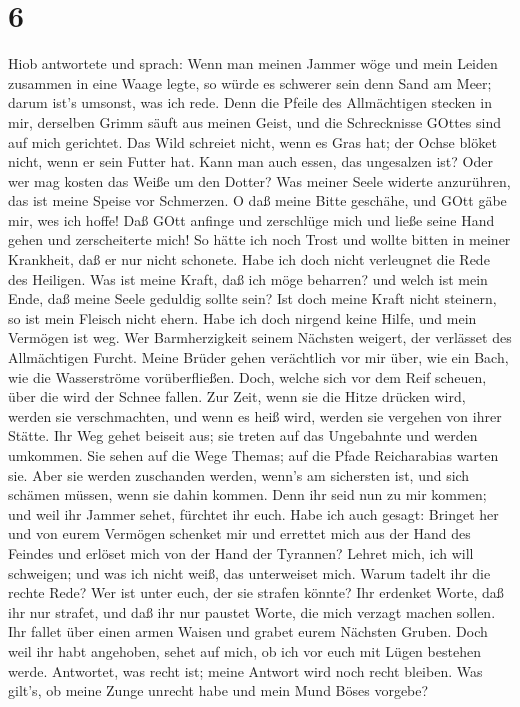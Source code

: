 \hypertarget{section-5}{%
\section{6}\label{section-5}}

 Hiob antwortete und sprach:  Wenn man meinen
Jammer wöge und mein Leiden zusammen in eine Waage legte, 
so würde es schwerer sein denn Sand am Meer; darum ist's umsonst, was
ich rede.  Denn die Pfeile des Allmächtigen stecken in mir,
derselben Grimm säuft aus meinen Geist, und die Schrecknisse GOttes sind
auf mich gerichtet.  Das Wild schreiet nicht, wenn es Gras
hat; der Ochse blöket nicht, wenn er sein Futter hat.  Kann
man auch essen, das ungesalzen ist? Oder wer mag kosten das Weiße um den
Dotter?  Was meiner Seele widerte anzurühren, das ist meine
Speise vor Schmerzen.  O daß meine Bitte geschähe, und GOtt
gäbe mir, wes ich hoffe!  Daß GOtt anfinge und zerschlüge
mich und ließe seine Hand gehen und zerscheiterte mich!  So
hätte ich noch Trost und wollte bitten in meiner Krankheit, daß er nur
nicht schonete. Habe ich doch nicht verleugnet die Rede des Heiligen.
 Was ist meine Kraft, daß ich möge beharren? und welch ist
mein Ende, daß meine Seele geduldig sollte sein?  Ist doch
meine Kraft nicht steinern, so ist mein Fleisch nicht ehern.
 Habe ich doch nirgend keine Hilfe, und mein Vermögen ist
weg.  Wer Barmherzigkeit seinem Nächsten weigert, der
verlässet des Allmächtigen Furcht.  Meine Brüder gehen
verächtlich vor mir über, wie ein Bach, wie die Wasserströme
vorüberfließen.  Doch, welche sich vor dem Reif scheuen,
über die wird der Schnee fallen.  Zur Zeit, wenn sie die
Hitze drücken wird, werden sie verschmachten, und wenn es heiß wird,
werden sie vergehen von ihrer Stätte.  Ihr Weg gehet
beiseit aus; sie treten auf das Ungebahnte und werden umkommen.
 Sie sehen auf die Wege Themas; auf die Pfade Reicharabias
warten sie.  Aber sie werden zuschanden werden, wenn's am
sichersten ist, und sich schämen müssen, wenn sie dahin kommen.
 Denn ihr seid nun zu mir kommen; und weil ihr Jammer
sehet, fürchtet ihr euch.  Habe ich auch gesagt: Bringet
her und von eurem Vermögen schenket mir  und errettet mich
aus der Hand des Feindes und erlöset mich von der Hand der Tyrannen?
 Lehret mich, ich will schweigen; und was ich nicht weiß,
das unterweiset mich.  Warum tadelt ihr die rechte Rede?
Wer ist unter euch, der sie strafen könnte?  Ihr erdenket
Worte, daß ihr nur strafet, und daß ihr nur paustet Worte, die mich
verzagt machen sollen.  Ihr fallet über einen armen Waisen
und grabet eurem Nächsten Gruben.  Doch weil ihr habt
angehoben, sehet auf mich, ob ich vor euch mit Lügen bestehen werde.
 Antwortet, was recht ist; meine Antwort wird noch recht
bleiben.  Was gilt's, ob meine Zunge unrecht habe und mein
Mund Böses vorgebe?


